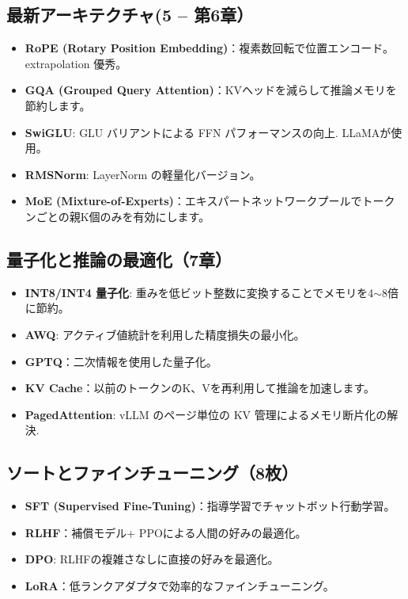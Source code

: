 \subsection{最新アーキテクチャ(5  --  第6章）}

\begin{itemize}
\item\textbf{RoPE (Rotary Position Embedding)}：複素数回転で位置エンコード。 extrapolation 優秀。
\item\textbf{GQA (Grouped Query Attention)}：KVヘッドを減らして推論メモリを節約します。
\item\textbf{SwiGLU}: GLU バリアントによる FFN パフォーマンスの向上. LLaMAが使用。
\item\textbf{RMSNorm}: LayerNorm の軽量化バージョン。
\item\textbf{MoE (Mixture-of-Experts)}：エキスパートネットワークプールでトークンごとの親K個のみを有効にします。
\end{itemize}

\subsection{量子化と推論の最適化（7章）}

\begin{itemize}
\item\textbf{INT8/INT4 量子化}: 重みを低ビット整数に変換することでメモリを4$\sim$8倍に節約。
\item\textbf{AWQ}: アクティブ値統計を利用した精度損失の最小化。
\item\textbf{GPTQ}：二次情報を使用した量子化。
\item\textbf{KV Cache}：以前のトークンのK、Vを再利用して推論を加速します。
\item\textbf{PagedAttention}: vLLM のページ単位の KV 管理によるメモリ断片化の解決.
\end{itemize}

\subsection{ソートとファインチューニング（8枚）}

\begin{itemize}
\item\textbf{SFT (Supervised Fine-Tuning)}：指導学習でチャットボット行動学習。
\item\textbf{RLHF}：補償モデル+ PPOによる人間の好みの最適化。
\item\textbf{DPO}: RLHFの複雑さなしに直接の好みを最適化。
\item\textbf{LoRA}：低ランクアダプタで効率的なファインチューニング。
\end{itemize}

